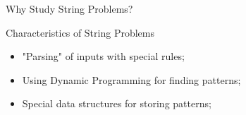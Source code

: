 \documentclass[aspectratio=169]{beamer}
\begin{document}
\begin{CJK}{UTF8}{ipxm}
\begin{frame}{Why Study String Problems?}
    \begin{block}{Characteristics of String Problems}
      \begin{itemize}
      \item "Parsing" of inputs with special rules;
      \item Using Dynamic Programming for finding patterns;
      \item Special data structures for storing patterns;
      \end{itemize}
    \end{block}
\end{frame}








\end{CJK}
\end{document}
